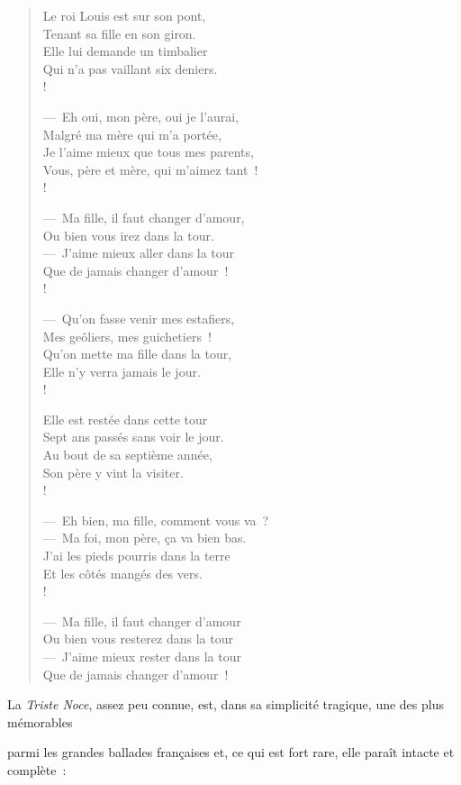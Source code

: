 \documentclass[french,twoside]{book} %
\begin{document}
\begin{verse}
Le roi Louis est sur son pont,\\
Tenant sa fille en son giron.\\
Elle lui demande un timbalier\\
Qui n’a pas vaillant six deniers.\\!

— Eh oui, mon père, oui je l’aurai,\\
Malgré ma mère qui m’a portée,\\
Je l’aime mieux que tous mes parents,\\
Vous, père et mère, qui m’aimez tant !\\!

— Ma fille, il faut changer d’amour,\\
Ou bien vous irez dans la tour.\\
— J’aime mieux aller dans la tour\\
Que de jamais changer d’amour !\\!

— Qu’on fasse venir mes estafiers,\\
Mes geôliers, mes guichetiers !\\
Qu’on mette ma fille dans la tour,\\
Elle n’y verra jamais le jour.\\!

Elle est restée dans cette tour\\
Sept ans passés sans voir le jour.\\
Au bout de sa septième année,\\
Son père y vint la visiter.\\!

— Eh bien, ma fille, comment vous va ?\\
— Ma foi, mon père, ça va bien bas.\\
J’ai les pieds pourris dans la terre\\
Et les côtés mangés des vers.\\!

— Ma fille, il faut changer d’amour\\
Ou bien vous resterez dans la tour\\
— J’aime mieux rester dans la tour\\
Que de jamais changer d’amour !\\
\end{verse}

\noindent La {\itshape Triste Noce}, assez peu connue, est, dans sa simplicité tragique, une des plus mémorables\par
parmi les grandes ballades françaises et, ce qui est fort rare, elle paraît intacte et complète :\par
\end{document}

